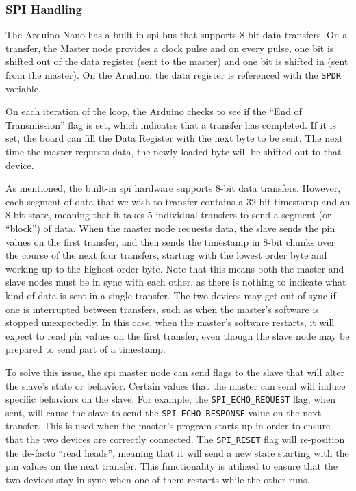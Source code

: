 \documentclass[12pt]{article}
\begin{document}
\subsubsection{SPI Handling}

The Arduino Nano has a built-in \gls{spi} bus that supports 8-bit data
transfers.
On a transfer, the Master node provides a clock pulse and on every pulse, one
bit is shifted out of the data register (sent to the master) and one bit is
shifted in (sent from the master).
On the Arudino, the data register is referenced with the \texttt{SPDR}
variable.

On each iteration of the loop, the Arduino checks to see if the ``End of
Transmission'' flag is set, which indicates that a transfer has completed.
If it is set, the board can fill the Data Register with the next byte to be
sent.
The next time the master requests data, the newly-loaded byte will be shifted
out to that device.

As mentioned, the built-in \gls{spi} hardware supports 8-bit data transfers.
However, each segment of data that we wish to transfer contains a 32-bit
timestamp and an 8-bit state, meaning that it takes 5 individual transfers
to send a segment (or ``block'') of data.
When the master node requests data, the slave sends the pin values on the
first transfer, and then sends the timestamp in 8-bit chunks over the course of
the next four transfers, starting with the lowest order byte and working up to
the highest order byte.
Note that this means both the master and slave nodes must be in sync with
each other, as there is nothing to indicate what kind of data is sent in a
single transfer.
The two devices may get out of sync if one is interrupted between transfers,
such as when the master's software is stopped unexpectedly.
In this case, when the master's software restarts, it will expect to read
pin values on the first transfer, even though the slave node may be prepared
to send part of a timestamp.

To solve this issue, the \gls{spi} master node can send flags to the slave
that will alter the slave's state or behavior.
Certain values that the master can send will induce specific behaviors on the
slave.
For example, the \texttt{SPI\_ECHO\_REQUEST} flag, when sent, will cause the
slave to send the \texttt{SPI\_ECHO\_RESPONSE} value on the next transfer.
This is used when the master's program starts up in order to ensure that the
two devices are correctly connected.
The \texttt{SPI\_RESET} flag will re-position the de-facto ``read heads'',
meaning that it will send a new state starting with the pin values on the next
transfer.
This functionality is utilized to ensure that the two devices stay in sync when
one of them restarts while the other runs.
\end{document}
